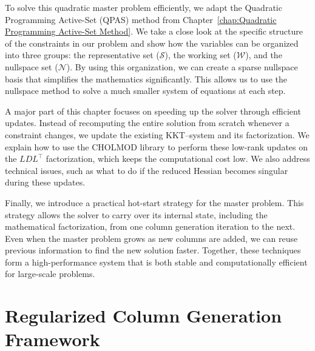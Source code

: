 \documentclass{book}
\theoremstyle{definition}
\numberwithin{algorithm_}{chapter}
\begin{document}
\medskip

To solve this quadratic master problem efficiently, we adapt the Quadratic Programming Active-Set (QPAS) method from Chapter~\ref{chap:Quadratic Programming Active-Set Method}. We take a close look at the specific structure of the constraints in our problem and show how the variables can be organized into three groups: the representative set ($\mathcal{S}$), the working set ($\mathcal{W}$), and the nullspace set ($\mathcal{N}$). By using this organization, we can create a sparse nullspace basis that simplifies the mathematics significantly. This allows us to use the nullspace method to solve a much smaller system of equations at each step.

\medskip

A major part of this chapter focuses on speeding up the solver through efficient updates. Instead of recomputing the entire solution from scratch whenever a constraint changes, we update the existing KKT--system and its factorization. We explain how to use the \textsc{CHOLMOD} library to perform these low-rank updates on the $LDL^\top$ factorization, which keeps the computational cost low. We also address technical issues, such as what to do if the reduced Hessian becomes singular during these updates.

\medskip

Finally, we introduce a practical hot-start strategy for the master problem. This strategy allows the solver to carry over its internal state, including the mathematical factorization, from one column generation iteration to the next. Even when the master problem grows as new columns are added, we can reuse previous information to find the new solution faster. Together, these techniques form a high-performance system that is both stable and computationally efficient for large-scale problems.


\vspace*{\fill}




\newpage


\section{Regularized Column Generation Framework}
\end{document}
